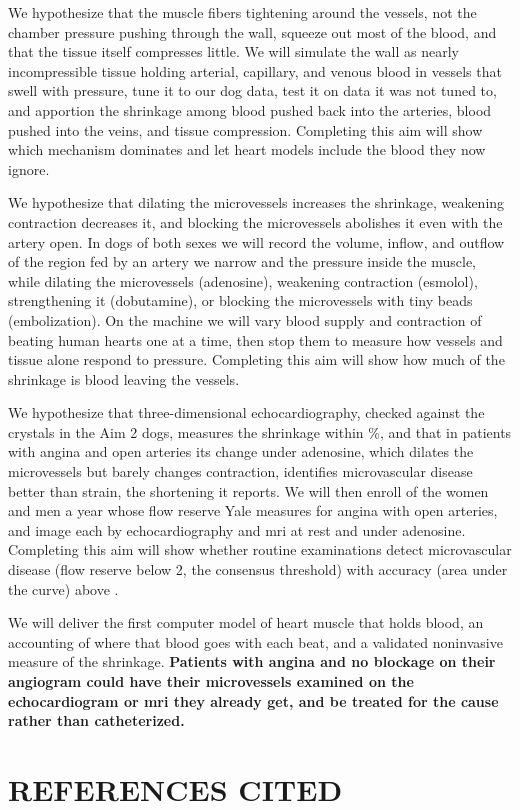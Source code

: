 \documentclass[11pt]{article}
\begin{document}
{We hypothesize that the muscle fibers tightening around the vessels, not the chamber pressure pushing through the wall, squeeze out most of the blood, and that the tissue itself compresses little. We will simulate the wall as nearly incompressible tissue holding arterial, capillary, and venous blood in vessels that swell with pressure,\cite{cookson12,lee16b} tune it to our dog data, test it on data it was not tuned to, and apportion the shrinkage among blood pushed back into the arteries, blood pushed into the veins, and tissue compression. Completing this aim will show which mechanism dominates and let heart models include the blood they now ignore.\cite{brown25,liu21c}}

{We hypothesize that dilating the microvessels increases the shrinkage, weakening contraction decreases it, and blocking the microvessels abolishes it even with the artery open. In  dogs of both sexes we will record the volume, inflow, and outflow of the region fed by an artery we narrow and the pressure inside the muscle, while dilating the microvessels (adenosine), weakening contraction (esmolol), strengthening it (dobutamine), or blocking the microvessels with tiny beads (embolization). On the machine we will vary blood supply and contraction of beating human hearts one at a time, then stop them to measure how vessels and tissue alone respond to pressure. Completing this aim will show how much of the shrinkage is blood leaving the vessels.}

{We hypothesize that three-dimensional echocardiography, checked against the crystals in the Aim 2 dogs, measures the shrinkage within \%, and that in patients with angina and open arteries its change under adenosine, which dilates the microvessels but barely changes contraction, identifies microvascular disease better than strain, the shortening it reports. We will then enroll  of the  women and men a year whose flow reserve Yale measures for angina with open arteries, and image each by echocardiography and \gls*{mri} at rest and under adenosine. Completing this aim will show whether routine examinations detect microvascular disease (flow reserve below 2, the consensus threshold)\cite{kunadian20} with accuracy (area under the curve) above .}

We will deliver the first computer model of heart muscle that holds blood, an accounting of where that blood goes with each beat, and a validated noninvasive measure of the shrinkage. \textbf{Patients with angina and no blockage on their angiogram could have their microvessels examined on the echocardiogram or \gls*{mri} they already get, and be treated for the cause rather than catheterized.}

\clearpage
\section*{\normalsize{REFERENCES CITED}}


\end{document}

